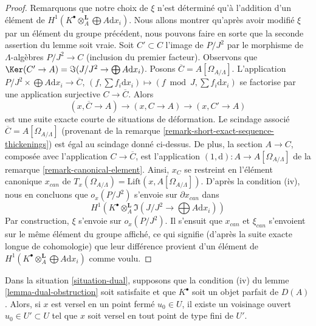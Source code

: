 \begin{proof}
\medskip\noindent
Remarquons que notre choix de $\xi$ n'est déterminé qu'à l'addition d'un
élément de $H^1(K^\bullet \otimes_A^\mathbf{L} \bigoplus A\text{d}x_i)$.
Nous allons montrer qu'après avoir modifié $\xi$ par un élément du groupe
précédent, nous pouvons faire en sorte que la seconde assertion du lemme soit
vraie. Soit $C' \subset C$ l'image de $P/J^2$ par le morphisme de
$\Lambda$-algèbres $P/J^2 \to C$ (inclusion du premier facteur). Observons que
$\Ker(C' \to A) = \Im(J/J^2 \to \bigoplus A\text{d}x_i)$.
Posons $\overline{C} = A[\Omega_{A/\Lambda}]$. L'application
$P/J^2 \times \bigoplus A \text{d}x_i \to \overline{C}$,
$(f, \sum f_i \text{d}x_i) \mapsto (f \bmod J, \sum f_i \text{d}x_i)$
se factorise par une application surjective $C \to \overline{C}$. Alors
$$
(x, \overline{C} \to A) \to (x, C \to A) \to (x, C' \to A)
$$
est une suite exacte courte de situations de déformation. Le scindage associé
$\overline{C} = A[\Omega_{A/\Lambda}]$ (provenant de la remarque
\ref{remark-short-exact-sequence-thickenings}) est égal au scindage donné
ci-dessus. De plus, la section $A \to C$, composée avec l'application
$C \to \overline{C}$, est l'application
$(1, \text{d}) : A \to A[\Omega_{A/\Lambda}]$ de la remarque
\ref{remark-canonical-element}. Ainsi, $x_C$ se restreint en l'élément
canonique $x_{can}$ de
$T_x(\Omega_{A/\Lambda}) = \text{Lift}(x, A[\Omega_{A/\Lambda}])$.
D'après la condition (iv), nous en concluons que $o_x(P/J^2)$ s'envoie sur
$\partial x_{can}$ dans
$$
H^1(K^\bullet \otimes_A^\mathbf{L} \Im(J/J^2 \to \bigoplus A\text{d}x_i))
$$
Par construction, $\xi$ s'envoie sur $o_x(P/J^2)$. Il s'ensuit que
$x_{can}$ et $\xi_{can}$ s'envoient sur le même élément du groupe affiché, ce
qui signifie (d'après la suite exacte longue de cohomologie) que leur différence
provient d'un élément de
$H^1(K^\bullet \otimes_A^\mathbf{L} \bigoplus A\text{d}x_i)$
comme voulu.
\end{proof}

\begin{lemma}
\label{lemma-dual-openness}
Dans la situation \ref{situation-dual}, supposons que la condition (iv) du
lemme \ref{lemma-dual-obstruction} soit satisfaite et que $K^\bullet$ soit un
objet parfait de $D(A)$. Alors, si $x$ est versel en un point fermé
$u_0 \in U$, il existe un voisinage ouvert $u_0 \in U' \subset U$ tel que $x$
soit versel en tout point de type fini de $U'$.
\end{lemma}

